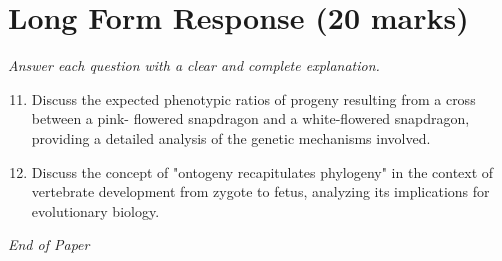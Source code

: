 \documentclass[12pt]{article}
\begin{document}
\section*{Long Form Response (20 marks)}
\textit{Answer each question with a clear and complete explanation.}
\begin{enumerate}[label=\arabic*.]
\setcounter{enumi}{10}
\item Discuss the expected phenotypic ratios of progeny resulting from a cross between a pink-
flowered snapdragon and a white-flowered snapdragon, providing a detailed analysis of the
genetic mechanisms involved.
\item Discuss the concept of "ontogeny recapitulates phylogeny" in the context of vertebrate
development from zygote to fetus, analyzing its implications for evolutionary biology.
\end{enumerate}

\vfill
\noindent\textit{End of Paper}
\end{document}
